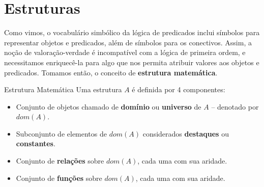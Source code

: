 \chapter{Estruturas}

Como vimos, o vocabulário simbólico da lógica de predicados inclui símbolos para representar objetos e predicados, além de símbolos para os conectivos. Assim, a noção de valoração-verdade é incompatível com a lógica de primeira ordem, e necessitamos enriquecê-la para algo que nos permita atribuir valores aos objetos e predicados. Tomamos então, o conceito de \textbf{estrutura matemática}.
\begin{definition}{Estrutura Matemática}
    Uma estrutura $A$ é definida por 4 componentes:
    \begin{itemize}
        \item Conjunto de objetos chamado de \textbf{domínio} ou \textbf{universo} de $A$ -- denotado por $dom(A)$.
        \item Subconjunto de elementos de $dom(A)$ considerados \textbf{destaques} ou \textbf{constantes}.
        \item Conjunto de \textbf{relações} sobre $dom(A)$, cada uma com sua aridade.
        \item Conjunto de \textbf{funções} sobre $dom(A)$, cada uma com sua aridade.
    \end{itemize}
\end{definition}

